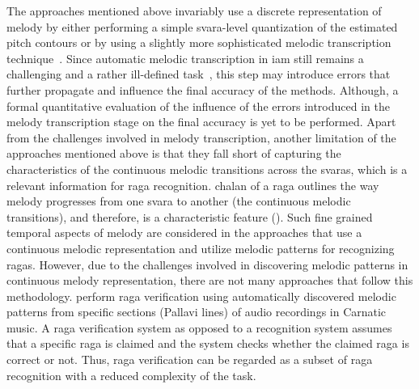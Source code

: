 The approaches mentioned above invariably use a discrete representation of melody by either performing a simple \gls{svara}-level quantization of the estimated pitch contours or by using a slightly more sophisticated melodic transcription technique~\citep{pandey2003tansen}. Since automatic melodic transcription in \gls{iam} still remains a challenging and a rather ill-defined task~\citep{widdess1994involving}, this step may introduce errors that further propagate and influence the final accuracy of the methods. Although, a formal quantitative evaluation of the influence of the errors introduced in the melody transcription stage on the final accuracy is yet to be performed. Apart from the challenges involved in melody transcription, another limitation of the approaches mentioned above is that they fall short of capturing the characteristics  of  the continuous melodic transitions across the \glspl{svara}, which is a relevant information for \gls{raga} recognition. \Gls{chalan} of a \gls{raga} outlines the way melody progresses from one \gls{svara} to another (the continuous melodic transitions), and therefore, is a characteristic feature (). Such fine grained temporal aspects of melody are considered in the approaches that use a continuous melodic representation and utilize melodic patterns for recognizing \glspl{raga}. However, due to the challenges involved in discovering melodic patterns in continuous melody representation, there are not many approaches that follow this methodology. \cite{shrey_ISMIR_2015} perform \gls{raga} verification using automatically discovered melodic patterns from specific sections (Pallavi lines) of audio recordings in Carnatic music. A \gls{raga} verification system as opposed to a recognition system assumes that a specific \gls{raga} is claimed and the system checks whether the claimed \gls{raga} is correct or not. Thus, \gls{raga} verification can be regarded as a subset of \gls{raga} recognition with a reduced complexity of the task. 

